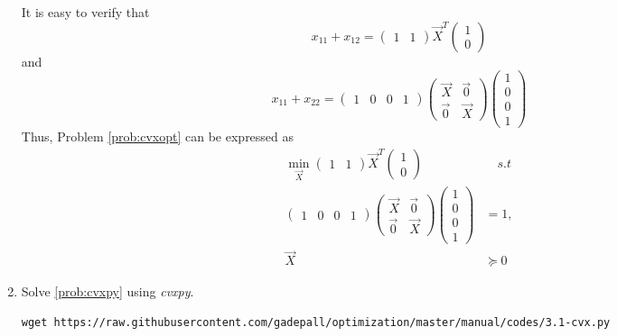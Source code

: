 \documentclass[journal,12pt,twocolumn]{IEEEtran}
\renewcommand\thesection{\arabic{section}}
\begin{document}
\begin{enumerate}[label=\thesection.\arabic*,ref=\thesection.\theenumi]
\solution
It is easy to verify that
\begin{equation}
x_{11} + x_{12} = 
\begin{pmatrix}
1 & 1
\end{pmatrix}
\vec{X}^{T}
\begin{pmatrix}
1 
\\
0
\end{pmatrix}
\end{equation}
and
\begin{equation}
x_{11} + x_{22} = 
\begin{pmatrix}
1 & 0 & 0 & 1
\end{pmatrix}
\begin{pmatrix}
\vec{X} & \vec{0} \\
\vec{0} & \vec{X}
\end{pmatrix}
\begin{pmatrix}
1
\\
0 
\\
0
\\
1
\end{pmatrix}
\end{equation}
%
Thus, Problem \ref{prob:cvxopt} can be expressed as
\begin{equation}
\begin{split}
\min_{\vec{X}} 
\begin{pmatrix}
1 & 1
\end{pmatrix}
\vec{X}^{T}
\begin{pmatrix}
1 
\\
0
\end{pmatrix}
& \quad s.t
\\
\begin{pmatrix}
1 & 0 & 0 & 1
\end{pmatrix}
\begin{pmatrix}
\vec{X} & \vec{0} \\
\vec{0} & \vec{X}
\end{pmatrix}
\begin{pmatrix}
1
\\
0 
\\
0
\\
1
\end{pmatrix}
&=1,
\\
\vec{X}
 & \succeq 0 
\end{split}
\label{prob:cvxpy}
\end{equation}
%	
\item
Solve \eqref{prob:cvxpy} using {\em cvxpy}.

%
\solution
\begin{lstlisting}
wget https://raw.githubusercontent.com/gadepall/optimization/master/manual/codes/3.1-cvx.py
\end{lstlisting}


\end{enumerate}
\end{document}
